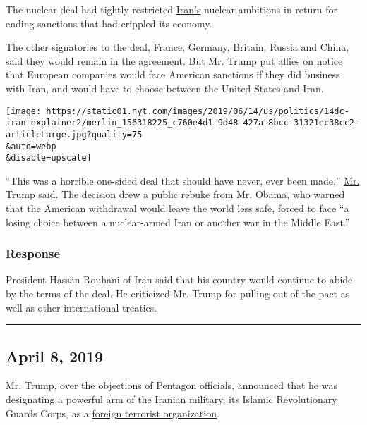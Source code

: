 The nuclear deal had tightly restricted
\href{https://www.nytimes.com/2019/06/20/us/politics/trump-iran.html}{Iran's}
nuclear ambitions in return for ending sanctions that had crippled its
economy.

The other signatories to the deal, France, Germany, Britain, Russia and
China, said they would remain in the agreement. But Mr. Trump put allies
on notice that European companies would face American sanctions if they
did business with Iran, and would have to choose between the United
States and Iran.

\texttt{[image: https://static01.nyt.com/images/2019/06/14/us/politics/14dc-iran-explainer2/merlin\_156318225\_c760e4d1-9d48-427a-8bcc-31321ec38cc2-articleLarge.jpg?quality=75\\\&auto=webp\\\&disable=upscale]}

``This was a horrible one-sided deal that should have never, ever been
made,''
\href{https://www.nytimes.com/2018/05/08/us/politics/trump-speech-iran-deal.html}{Mr.
Trump said}. The decision drew a public rebuke from Mr. Obama, who
warned that the American withdrawal would leave the world less safe,
forced to face ``a losing choice between a nuclear-armed Iran or another
war in the Middle East.''

\hypertarget{response}{%
\subsubsection{\texorpdfstring{\textbf{Response}}{Response}}\label{response}}

President Hassan Rouhani of Iran said that his country would continue to
abide by the terms of the deal. He criticized Mr. Trump for pulling out
of the pact as well as other international treaties.

\begin{center}\rule{0.5\linewidth}{\linethickness}\end{center}

\hypertarget{april-8-2019}{%
\subsection{April 8, 2019}\label{april-8-2019}}

Mr. Trump, over the objections of Pentagon officials, announced that he
was designating a powerful arm of the Iranian military, its Islamic
Revolutionary Guards Corps, as a
\href{https://www.nytimes.com/2019/04/08/world/middleeast/trump-iran-revolutionary-guard-corps.html}{foreign
terrorist organization}.

